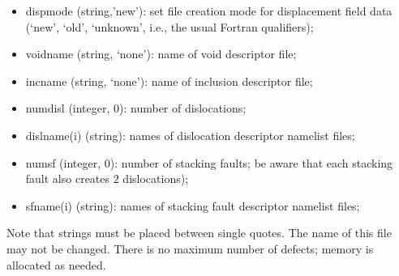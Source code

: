 \documentclass[11pt]{article}
\begin{document}
\begin{itemize}
\item \textsf{dispmode} (string,'new'): set file creation mode for displacement field data (`new', `old', `unknown', i.e., the usual Fortran qualifiers);
\item \textsf{voidname} (string, `none'): name of  void descriptor file;
\item \textsf{incname} (string, `none'): name of  inclusion descriptor file;
\item \textsf{numdisl} (integer, $0$): number of dislocations;
\item \textsf{dislname(i)} (string): names of dislocation descriptor namelist files;
\item \textsf{numsf} (integer, $0$): number of stacking faults; be aware that each stacking fault also creates $2$ dislocations);
\item \textsf{sfname(i)} (string): names of stacking fault descriptor namelist files;
\end{itemize}
Note that strings must be placed between single quotes.  The name of this file may not be changed.  There is no maximum number of defects; memory is allocated as needed.
\end{document}

